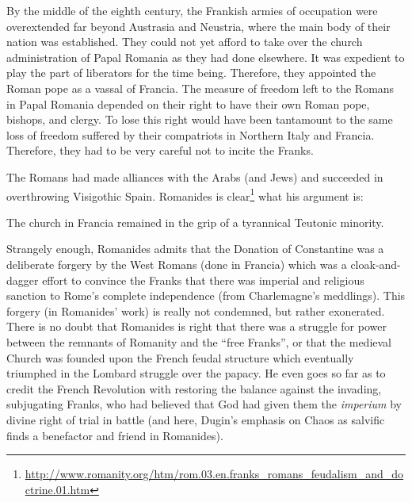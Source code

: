 \begin{quotationx}
By the middle of the eighth century, the Frankish armies of occupation were overextended far beyond Austrasia and Neustria, where the main body of their nation was established. They could not yet afford to take over the church administration of Papal Romania as they had done elsewhere. It was expedient to play the part of liberators for the time being. Therefore, they appointed the Roman pope as a vassal of Francia. The measure of freedom left to the Romans in Papal Romania depended on their right to have their own Roman pope, bishops, and clergy. To lose this right would have been tantamount to the same loss of freedom suffered by their compatriots in Northern Italy and Francia. Therefore, they had to be very careful not to incite the Franks.
\end{quotationx}


The Romans had made alliances with the Arabs (and Jews) and succeeded in overthrowing Visigothic Spain. Romanides is clear\footnote{\url{http://www.romanity.org/htm/rom.03.en.franks\_romans\_feudalism\_and\_doctrine.01.htm}} what his argument is:

\begin{quotex}
The church in Francia remained in the grip of a tyrannical Teutonic minority.
\end{quotex}


Strangely enough, Romanides admits that the Donation of Constantine was a deliberate forgery by the West Romans (done in Francia) which was a cloak-and-dagger effort to convince the Franks that there was imperial and religious sanction to Rome's complete independence (from Charlemagne's meddlings). This forgery (in Romanides' work) is really not condemned, but rather exonerated. There is no doubt that Romanides is right that there was a struggle for power between the remnants of Romanity and the ``free Franks'', or that the medieval Church was founded upon the French feudal structure which eventually triumphed in the Lombard struggle over the papacy. He even goes so far as to credit the French Revolution with restoring the balance against the invading, subjugating Franks, who had believed that God had given them the \emph{imperium} by divine right of trial in battle (and here, Dugin's emphasis on Chaos as salvific finds a benefactor and friend in Romanides).

